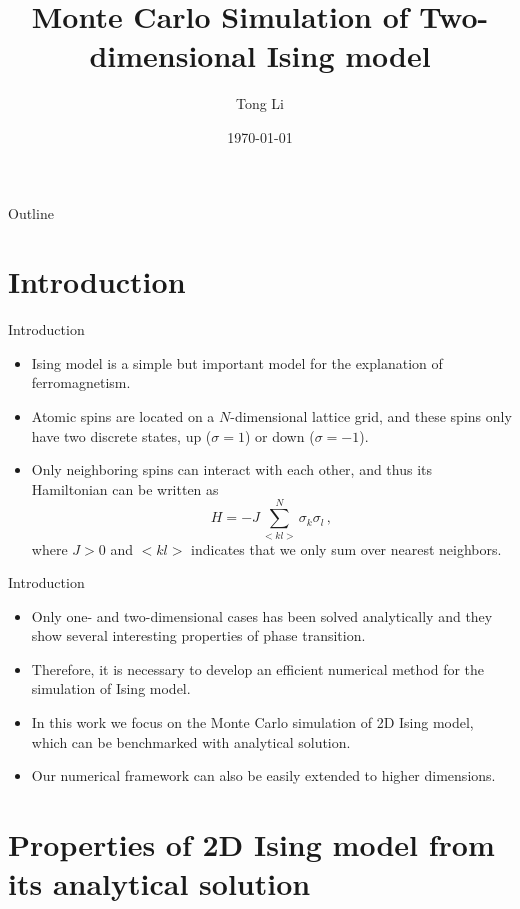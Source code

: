 \documentclass{beamer}
\title{Monte Carlo Simulation of Two-dimensional Ising model}
\author{Tong Li}
\institute{Department of Physics \& Astronomy \\ Michigan State University }
\date{\today}
\begin{document}
\beamertemplatenavigationsymbolsempty

\thispagestyle{empty} 
\begin{frame}
\titlepage
\end{frame}

\begin{frame}{Outline}
\tableofcontents
\end{frame} 

\section{Introduction}	
\begin{frame}{Introduction}
\begin{itemize}
	\item <1-> Ising model is a simple but important model for the explanation of ferromagnetism.  
	\item <2-> 
	Atomic spins are located on a $N$-dimensional lattice grid, 
	and these spins only have two discrete states, up ($\sigma=1$) or down ($\sigma=-1$). 
	\item <3-> 
	Only neighboring spins can interact with each other, and thus its Hamiltonian can be written as 
	\begin{equation}\label{eq:hamiltonian}
	H=-J\sum_{<kl>}^{N}\sigma_k\sigma_l\,, 
	\end{equation}
	where $J>0$ and $<kl>$ indicates that we only sum over nearest neighbors. 
\end{itemize}
\end{frame}

\begin{frame}{Introduction}
\begin{itemize}
	\item <1-> Only one- and two-dimensional cases has been solved analytically and they show several interesting properties of phase transition. 
	\item <1-> Therefore, it is necessary to develop an efficient numerical method for the simulation of Ising model. 
	\item <2-> In this work we focus on the Monte Carlo simulation of 2D Ising model, which can be benchmarked with analytical solution. 
	\item <3-> Our numerical framework can also be easily extended to higher dimensions. 
\end{itemize}
\end{frame}

\section{Properties of 2D Ising model from its analytical solution}
\end{document}
